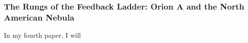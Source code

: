 \subsubsection{The Rungs of the Feedback Ladder: Orion A and the North American Nebula}\label{sec:paper4}
        In my fourth paper, I will 
